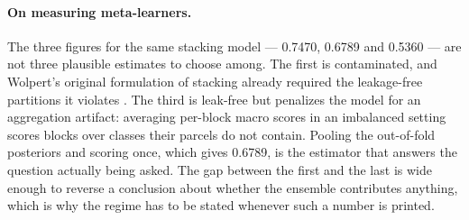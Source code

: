 \paragraph{On measuring meta-learners.}
The three figures for the same stacking model --- \num{0.7470}, \num{0.6789} and \num{0.5360} ---
are not three plausible estimates to choose among. The first is contaminated, and Wolpert's
original formulation of stacking already required the leakage-free partitions it violates
\cite{wolpert1992stacking}. The third is leak-free but penalizes the model for an aggregation
artifact: averaging per-block macro scores in an imbalanced setting scores blocks over classes
their parcels do not contain. Pooling the out-of-fold posteriors and scoring once, which gives
\num{0.6789}, is the estimator that answers the question actually being asked. The gap between the
first and the last is wide enough to reverse a conclusion about whether the ensemble contributes
anything, which is why the regime has to be stated whenever such a number is printed.
